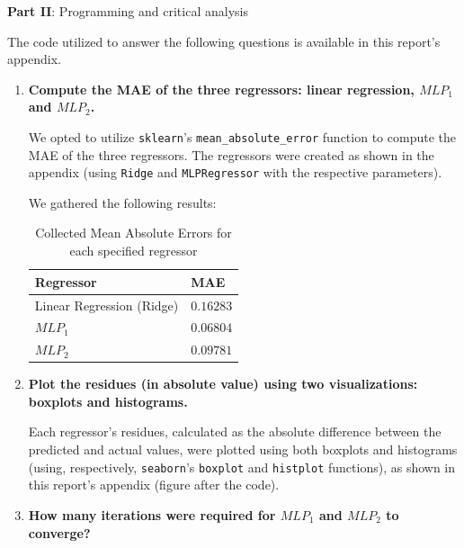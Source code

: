 \documentclass[12pt]{article}
\begin{document}
\pagebreak

\center\large{\textbf{Part II}: Programming and critical analysis}

\begin{justify}
  The code utilized to answer the following questions is available in this
  report's appendix.
\end{justify}

\begin{enumerate}[leftmargin=\labelsep,resume]
  \item \textbf{Compute the MAE of the three regressors: linear regression, $MLP_1$ and $MLP_2$.}

        We opted to utilize \texttt{sklearn}'s \texttt{mean\_absolute\_error} function to compute the MAE of the three regressors.
        The regressors were created as shown in the appendix (using \texttt{Ridge} and
        \texttt{MLPRegressor} with the respective parameters).

        We gathered the following results:

        \begin{table}[H]
          \centering
          \begin{tabular}{l|l}
            \textbf{Regressor}        & \textbf{MAE} \\ \hline
            Linear Regression (Ridge) & $0.16283$    \\
            $MLP_1$                   & $0.06804$    \\
            $MLP_2$                   & $0.09781$
          \end{tabular}
          \caption{Collected Mean Absolute Errors for each specified regressor}
          \label{tab:mean-absolute-errors}
        \end{table}

  \item \textbf{Plot the residues (in absolute value) using two visualizations: boxplots and histograms.}

        Each regressor's residues, calculated as the absolute difference between
        the predicted and actual values, were plotted using both boxplots and histograms
        (using, respectively, \texttt{seaborn}'s \texttt{boxplot} and \texttt{histplot} functions),
        as shown in this report's appendix (figure after the code).

  \item \textbf{How many iterations were required for $MLP_1$ and $MLP_2$ to converge?}


\end{enumerate}
\end{document}
